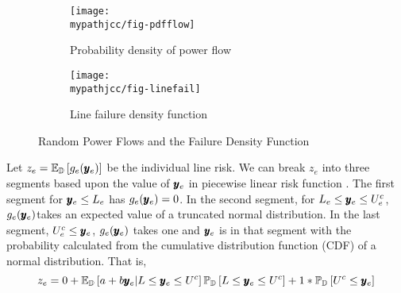 \begin{figure}
 \centering                    
  \begin{subfigure}[b]{0.4\textwidth}
   \texttt{[image: \\mypathjcc/fig-pdfflow]}   
   \caption{Probability density of power flow}
  \end{subfigure}
  \begin{subfigure}[b]{.4\textwidth}
    \texttt{[image: \\mypathjcc/fig-linefail]}
    \caption{Line failure density function}
  \end{subfigure}
  \caption{Random Power Flows and the Failure Density Function}
\end{figure}




Let $ z_e = \mathbb{E}_{\mathbb{D}} \left[ g_e(\pmb{y}_e) \right] $ be the individual line risk. We can break $z_e$ into three segments based upon the value of $\pmb{y}_e$ in piecewise linear risk  function .  The first segment for $\pmb{y}_e \leq L_e$ has $g_e(\pmb{y}_e) = 0$. In the second segment, for $L_e \leq \pmb{y}_e \leq U_e^c$, $g_e(\pmb{y}_e)$takes an expected value of a truncated normal distribution.  In the last segment, $U_e^c \leq \pmb{y}_e$, $g_e(\pmb{y}_e)$ takes one and $\pmb{y}_e$ is in that segment with the probability calculated from the cumulative distribution function (CDF)  of a normal distribution.  That is,
\[ z_e = 0 +  \mathbb{E}_{\mathbb{D}} \left[  a+b\pmb{y}_e | L \leq \pmb{y}_e \leq U^c  \right] \mathbb{P}_{\mathbb{D}} \left[ L\leq \pmb{y}_e \leq U^c \right]  + 1 * \mathbb{P}_{\mathbb{D}} \left[  U^c \leq \pmb{y}_e  \right] \] 

